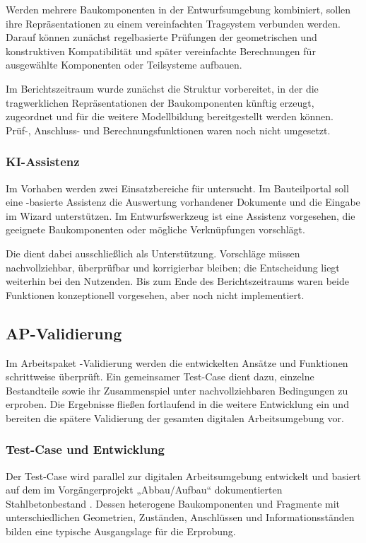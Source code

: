 \documentclass[type=zwischenbericht]{zukunftbau}
\begin{document}
Werden mehrere Baukomponenten in der Entwurfsumgebung kombiniert, sollen ihre Repräsentationen zu einem vereinfachten Tragsystem verbunden werden. Darauf können zunächst regelbasierte Prüfungen der geometrischen und konstruktiven Kompatibilität und später vereinfachte Berechnungen für ausgewählte Komponenten oder Teilsysteme aufbauen.

Im Berichtszeitraum wurde zunächst die Struktur vorbereitet, in der die tragwerklichen Repräsentationen der Baukomponenten künftig erzeugt, zugeordnet und für die weitere Modellbildung bereitgestellt werden können. Prüf-, Anschluss- und Berechnungsfunktionen waren noch nicht umgesetzt.

\subsubsection{KI-Assistenz}
Im Vorhaben werden zwei Einsatzbereiche für  untersucht. Im Bauteilportal soll eine -basierte Assistenz die Auswertung vorhandener Dokumente und die Eingabe im Wizard unterstützen. Im Entwurfswerkzeug ist eine Assistenz vorgesehen, die geeignete Baukomponenten oder mögliche Verknüpfungen vorschlägt.

Die  dient dabei ausschließlich als Unterstützung. Vorschläge müssen nachvollziehbar, überprüfbar und korrigierbar bleiben; die Entscheidung liegt weiterhin bei den Nutzenden. Bis zum Ende des Berichtszeitraums waren beide Funktionen konzeptionell vorgesehen, aber noch nicht implementiert.

\subsection{AP-Validierung}

Im Arbeitspaket -Validierung werden die entwickelten Ansätze und Funktionen schrittweise überprüft. Ein gemeinsamer Test-Case dient dazu, einzelne Bestandteile sowie ihr Zusammenspiel unter nachvollziehbaren Bedingungen zu erproben. Die Ergebnisse fließen fortlaufend in die weitere Entwicklung ein und bereiten die spätere Validierung der gesamten digitalen Arbeitsumgebung vor.

\subsubsection{Test-Case und Entwicklung}
Der Test-Case wird parallel zur digitalen Arbeitsumgebung entwickelt und basiert auf dem im Vorgängerprojekt „Abbau/Aufbau“ dokumentierten Stahlbetonbestand \cite{henschel-abbau-aufbau-2020}. Dessen heterogene Baukomponenten und Fragmente mit unterschiedlichen Geometrien, Zuständen, Anschlüssen und Informationsständen bilden eine typische Ausgangslage für die Erprobung.
\end{document}
